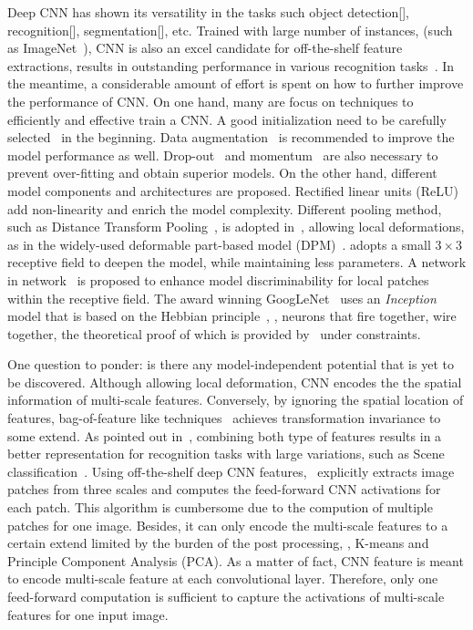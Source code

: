 \documentclass[10pt,twocolumn,letterpaper]{article}
\begin{document}
Deep CNN has shown its versatility in the tasks such object detection[], recognition[], segmentation[], etc. Trained with large number of instances, (such as ImageNet~\cite{ImageNet}), CNN is also an excel candidate for off-the-shelf feature extractions, results in outstanding performance in various recognition tasks~\cite{cnn_baseline}. In the meantime, a considerable amount of effort is spent on how to further improve the performance of CNN. On one hand, many are focus on techniques to efficiently and effective train a CNN. A good initialization need to be carefully selected~\cite{diff_cnn} in the beginning. Data augmentation~\cite{AlexNet} is recommended to improve the model performance as well. Drop-out~\cite{dropout} and momentum~\cite{momentum} are also necessary to prevent over-fitting and obtain superior models. On the other hand, different model components and architectures are proposed. Rectified linear units (ReLU)~\cite{AlexNet} add non-linearity and enrich the model complexity. Different pooling method, such as Distance Transform Pooling~\cite{dist_trans}, is adopted in~\cite{dpm_is_cnn}, allowing local deformations, as in the widely-used deformable part-based model (DPM)~\cite{dpm}. \cite{veryDeep} adopts a small $3\times 3$ receptive field to deepen the model, while maintaining less parameters. A network in network~\cite{nin} is proposed to enhance model discriminability for local patches within the receptive field. The award winning GoogLeNet~\cite{GoogLeNet} uses an \textit{Inception} model that is based on the Hebbian principle~\cite{Hebb}, \ie, neurons that fire together, wire together, the theoretical proof of which is provided by~\cite{dnn_proof} under constraints. 

One question to ponder: is there any model-independent potential that is yet to be discovered. Although allowing local deformation, CNN encodes the the spatial information of multi-scale features. Conversely, by ignoring the spatial location of features, bag-of-feature like techniques~\cite{spatial_pyramid} achieves transformation invariance to some extend. As pointed out in~\cite{Gong14}, combining both type of features results in a better representation for recognition tasks with large variations, such as Scene classification~\cite{SUN397,MIT67}. Using off-the-shelf deep CNN features,~\cite{Gong14} explicitly extracts image patches from three scales and computes the feed-forward CNN activations for each patch. This algorithm is cumbersome due to the compution of multiple patches for one image. Besides, it can only encode the multi-scale features to a certain extend limited by the burden of the post processing, \ie, K-means and Principle Component Analysis (PCA). As a matter of fact, CNN feature is meant to encode multi-scale feature at each convolutional layer. Therefore, only one feed-forward computation is sufficient to capture the activations of multi-scale features for one input image. 
\end{document}

